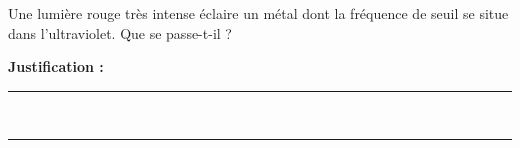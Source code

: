 Une lumière rouge très intense éclaire un métal dont la fréquence de seuil se situe dans l'ultraviolet. Que se passe-t-il ?

\choices

\noindent\textbf{Justification :} \hrulefill \\[2.5ex]
\rule{\linewidth}{0.4pt} \\[2.5ex]
\rule{\linewidth}{0.4pt}
\vfill
